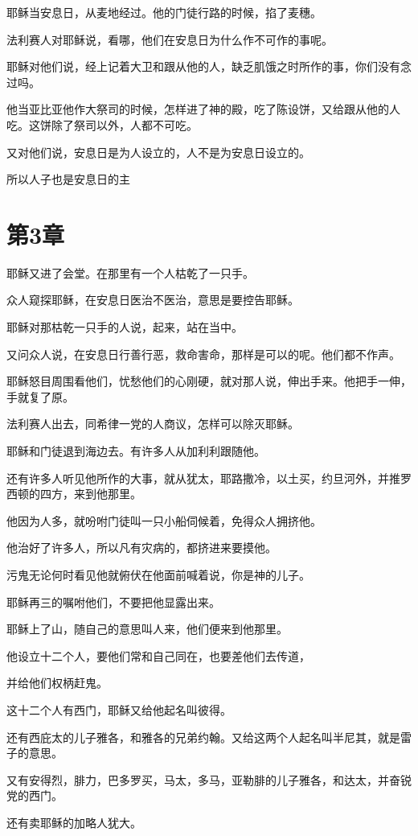 \documentclass[12pt,oneside]{book}
\begin{document}
耶稣当安息日，从麦地经过。他的门徒行路的时候，掐了麦穗。

法利赛人对耶稣说，看哪，他们在安息日为什么作不可作的事呢。

耶稣对他们说，经上记着大卫和跟从他的人，缺乏肌饿之时所作的事，你们没有念过吗。

他当亚比亚他作大祭司的时候，怎样进了神的殿，吃了陈设饼，又给跟从他的人吃。这饼除了祭司以外，人都不可吃。

又对他们说，安息日是为人设立的，人不是为安息日设立的。

所以人子也是安息日的主

\chapter{第3章}
耶稣又进了会堂。在那里有一个人枯乾了一只手。

众人窥探耶稣，在安息日医治不医治，意思是要控告耶稣。

耶稣对那枯乾一只手的人说，起来，站在当中。

又问众人说，在安息日行善行恶，救命害命，那样是可以的呢。他们都不作声。

耶稣怒目周围看他们，忧愁他们的心刚硬，就对那人说，伸出手来。他把手一伸，手就复了原。

法利赛人出去，同希律一党的人商议，怎样可以除灭耶稣。

耶稣和门徒退到海边去。有许多人从加利利跟随他。

还有许多人听见他所作的大事，就从犹太，耶路撒冷，以土买，约旦河外，并推罗西顿的四方，来到他那里。

他因为人多，就吩咐门徒叫一只小船伺候着，免得众人拥挤他。

他治好了许多人，所以凡有灾病的，都挤进来要摸他。

污鬼无论何时看见他就俯伏在他面前喊着说，你是神的儿子。

耶稣再三的嘱咐他们，不要把他显露出来。

耶稣上了山，随自己的意思叫人来，他们便来到他那里。

他设立十二个人，要他们常和自己同在，也要差他们去传道，

并给他们权柄赶鬼。

这十二个人有西门，耶稣又给他起名叫彼得。

还有西庇太的儿子雅各，和雅各的兄弟约翰。又给这两个人起名叫半尼其，就是雷子的意思。

又有安得烈，腓力，巴多罗买，马太，多马，亚勒腓的儿子雅各，和达太，并奋锐党的西门。

还有卖耶稣的加略人犹大。
\end{document}
